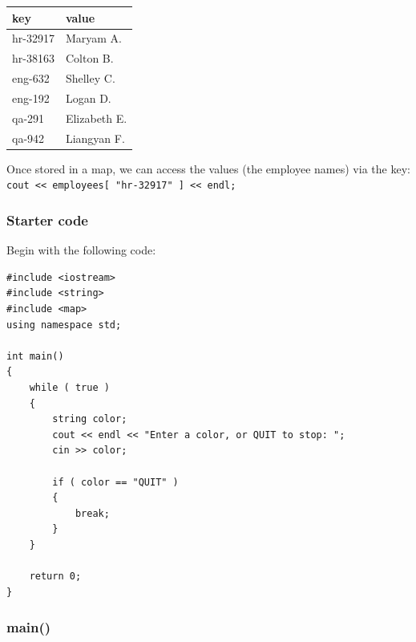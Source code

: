 \documentclass[a4paper,12pt]{book}
\begin{document}
                    \begin{center}
                        \begin{tabular}{ | l | l | }
                            \hline
                            \textbf{ key } & \textbf{ value }  \\ \hline
                                hr-32917 & Maryam A. \\ \hline
                                hr-38163 & Colton B. \\ \hline
                                eng-632 & Shelley C. \\ \hline
                                eng-192 & Logan D. \\ \hline
                                qa-291 & Elizabeth E. \\ \hline
                                qa-942 & Liangyan F. \\ \hline
                        \end{tabular}
                    \end{center}

                    Once stored in a map, we can access the values (the
                    employee names) via the key:
                    \texttt{ cout << employees[ "hr-32917" ] << endl; }
                    


                \hrulefill{}
                \subsubsection*{ Starter code }
                    Begin with the following code:

\begin{lstlisting}[style=code]
#include <iostream>
#include <string>
#include <map>
using namespace std;

int main()
{
    while ( true )
    {
        string color;
        cout << endl << "Enter a color, or QUIT to stop: ";
        cin >> color;
        
        if ( color == "QUIT" )
        {
            break;
        }
    }
    
    return 0;
}
\end{lstlisting}

                \hrulefill{}
                \subsubsection*{ main() }
\end{document}
